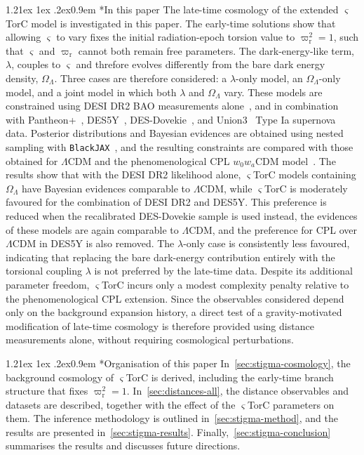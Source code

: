 \documentclass[aps,prd,reprint,preprintnumbers,showpacs,floatfix,nofootinbib,superscriptaddress]{revtex4-2}
\makeatletter
\renewcommand{\paragraph}{%
\@startsection{paragraph}{4}%
{\z@}{1.21ex \@plus 1ex \@minus .2ex}{0.9em}%
{\normalfont\normalsize\bfseries}%
}
\newcommand{\LCDM}{\ensuremath{\Lambda\mathrm{CDM}}}
\newcommand{\cprr}{\varpi_\mathrm{r}}
\makeatother
\begin{document}
\paragraph*{In this paper} The late-time cosmology of the extended $\varsigma$TorC model is investigated in this paper. The early-time solutions show that allowing $\varsigma$ to vary fixes the initial radiation-epoch torsion value to $\cprr^2=1$, such that $\varsigma$ and $\cprr$ cannot both remain free parameters. The dark-energy-like term, $\lambda$, couples to $\varsigma$ and threfore evolves differently from the bare dark energy density, $\Omega_\Lambda$. Three cases are therefore considered: a $\lambda$-only model, an $\Omega_\Lambda$-only model, and a joint model in which both $\lambda$ and $\Omega_\Lambda$ vary. These models are constrained using DESI DR2 BAO measurements alone~\citep{DESI:2024uvr,DESI:2024mwx,DESI:2025zgx,DESI:2025zpo}, and in combination with Pantheon+~\citep{Brout:2022vxf}, DES5Y~\citep{DES:2024jxu}, DES-Dovekie~\citep{Popovic:2025glk}, and Union3~\citep{Rubin:2023ovl} Type Ia supernova data. Posterior distributions and Bayesian evidences are obtained using nested sampling with \texttt{BlackJAX}~\citep{Yallup:2026nested}, and the resulting constraints are compared with those obtained for \LCDM{} and the phenomenological CPL $w_0w_a$CDM model~\citep{Chevallier:2000qy,Linder:2002et}. The results show that with the DESI DR2 likelihood alone, $\varsigma$TorC models containing $\Omega_\Lambda$ have Bayesian evidences comparable to \LCDM{}, while $\varsigma$TorC is moderately favoured for the combination of DESI DR2 and DES5Y. This preference is reduced when the recalibrated DES-Dovekie sample is used instead, the evidences of these models are again comparable to \LCDM{}, and the preference for CPL over \LCDM{} in DES5Y is also removed. The $\lambda$-only case is consistently less favoured, indicating that replacing the bare dark-energy contribution entirely with the torsional coupling $\lambda$ is not preferred by the late-time data. Despite its additional parameter freedom, $\varsigma$TorC incurs only a modest complexity penalty relative to the phenomenological CPL extension. Since the observables considered depend only on the background expansion history, a direct test of a gravity-motivated modification of late-time cosmology is therefore provided using distance measurements alone, without requiring cosmological perturbations.

\paragraph*{Organisation of this paper} In~\cref{sec:stigma-cosmology}, the background cosmology of $\varsigma$TorC is derived, including the early-time branch structure that fixes $\cprr^2=1$. In~\cref{sec:distances-all}, the distance observables and datasets are described, together with the effect of the $\varsigma$TorC parameters on them. The inference methodology is outlined in~\cref{sec:stigma-method}, and the results are presented in~\cref{sec:stigma-results}. Finally,~\cref{sec:stigma-conclusion} summarises the results and discusses future directions.
\end{document}
